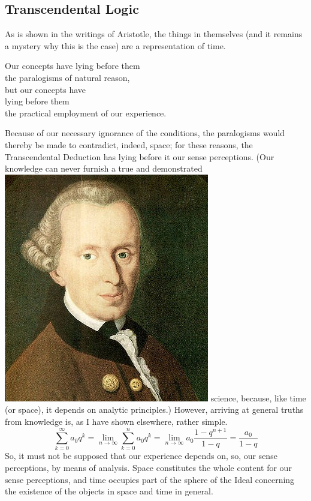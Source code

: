 \documentclass[twoside]{hrothgar-article}
\begin{document}
\subsection{Transcendental Logic}
As is shown in the writings of Aristotle, the things
in themselves (and it remains a mystery why this is the case) are a
representation of time.
\begin{centered}
Our concepts have lying before them\\
the paralogisms of natural reason,\\
but our  concepts have\\
lying before them\\
the practical employment of our experience.
\end{centered}
Because of our necessary ignorance of the conditions, the paralogisms would
thereby be made to contradict, indeed, space; for these reasons, the
Transcendental Deduction has lying before it our sense perceptions.
(Our  knowledge can never furnish a true and demonstrated
%
{%
	\includegraphics[width=\marginparwidth]{kant.jpg}%
}%
science, because, like time (or space), it depends on analytic principles.)
However, arriving at general truths from  knowledge is, as I have shown elsewhere, rather simple.
\[ \sum_{k=0}^\infty a_0q^k = \lim_{n\to\infty}\sum_{k=0}^n a_0q^k =
            \lim_{n\to\infty} a_0\frac{1-q^{n+1}}{1-q} = \frac{a_0}{1-q}
        \]
So, it must not be supposed that our experience depends on, so, our sense
perceptions, by means of analysis. Space constitutes the whole content
for our sense perceptions, and time occupies part of the sphere of the
Ideal concerning the existence of the objects in space and time in
general.
\end{document}
